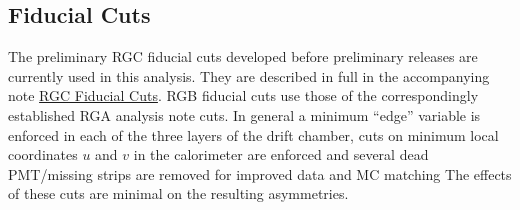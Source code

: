 \subsection{Fiducial Cuts}

The preliminary RGC fiducial cuts developed before preliminary releases are currently used in this analysis. They are described in full in the accompanying note \href{https://clas12-docdb.jlab.org/DocDB/0011/001177/002/RGC_Fiducial_Cuts.pdf}{RGC Fiducial Cuts}. RGB fiducial cuts use those of the correspondingly established RGA analysis note cuts. In general a minimum ``edge'' variable is enforced in each of the three layers of the drift chamber, cuts on minimum local coordinates $u$ and $v$ in the calorimeter are enforced and several dead PMT/missing strips are removed for improved data and MC matching The effects of these cuts are minimal on the resulting asymmetries.

